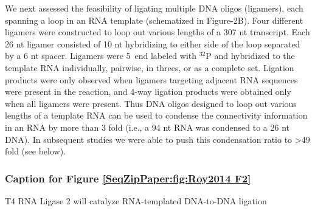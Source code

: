 		We next assessed the feasibility of ligating multiple DNA oligos (ligamers), each spanning a loop in an RNA template (schematized in Figure-2B). Four different ligamers were constructed to loop out various lengths of a 307 nt transcript. Each 26 nt ligamer consisted of 10 nt hybridizing to either side of the loop separated by a 6 nt spacer. Ligamers were 5\textprime~end labeled with $^{32}$P and hybridized to the template RNA individually, pairwise, in threes, or as a complete set. Ligation products were only observed when ligamers targeting adjacent RNA sequences were present in the reaction, and 4-way ligation products were obtained only when all ligamers were present. Thus DNA oligos designed to loop out various lengths of a template RNA can be used to condense the connectivity information in an RNA by more than 3 fold (i.e., a 94 nt RNA was condensed to a 26 nt DNA). In subsequent studies we were able to push this condensation ratio to >49 fold (see below).

		\subsubsection{Caption for Figure \ref{SeqZipPaper:fig:Roy2014 F2}}
			\label{SeqZipPaper:figCap: Roy2014 F2}

			T4 RNA Ligase 2 will catalyze RNA-templated DNA-to-DNA ligation

